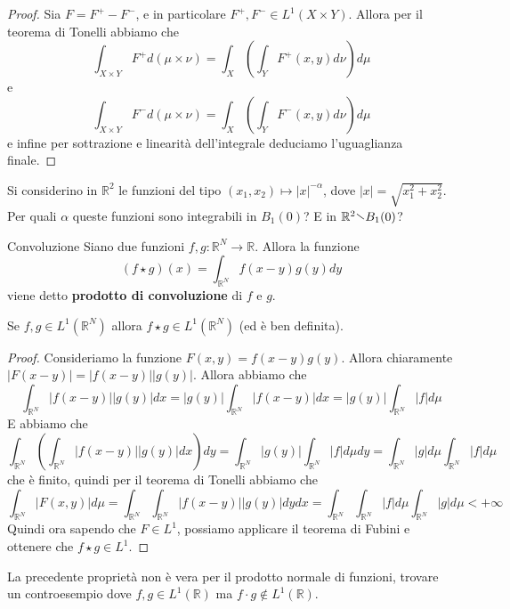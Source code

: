 \begin{proof}
    Sia \(F = F^{+} - F^{-}\), e in particolare \(F^{+}, F^{-} \in L^{1}(X
    \times Y)\). Allora per il teorema di Tonelli abbiamo che
    \[
        \int_{X \times Y} F^{+} d(\mu \times \nu) = \int_X \left( \int_Y F^{+}(x,y)
        d\nu \right) d\mu
    \]
    e
    \[
        \int_{X \times Y} F^{-} d(\mu \times \nu) = \int_X \left( \int_Y F^{-}(x,y)
        d\nu \right) d\mu
    \]
    e infine per sottrazione e linearità dell'integrale deduciamo l'uguaglianza
    finale.
\end{proof}
\begin{eser}
    Si considerino in \(\mathbb{R}^2\) le funzioni del tipo \((x_{1}, x_{2})
    \mapsto |x|^{-\alpha}\), dove \(|x| = \sqrt{x_{1}^2 + x_{2}^2}\). Per quali
    \(\alpha\) queste funzioni sono integrabili in \(B_{1}(0)\)? E in
    \(\mathbb{R}^2 \sminus B_{1}(0)\)?
\end{eser}
\begin{definition}{Convoluzione}
    Siano due funzioni \(f, g : \mathbb{R}^{N} \to \mathbb{R}\). Allora la
    funzione
    \[
        (f \star g)(x) = \int_{\mathbb{R}^{N}} f(x-y) g(y) dy
    \]
    viene detto \textbf{prodotto di convoluzione} di \(f\) e \(g\).
\end{definition}
\begin{proposition}\label{prp:convoluzione_l1}
    Se \(f, g \in L^{1}(\mathbb{R}^{N})\) allora \(f \star g \in
    L^{1}(\mathbb{R}^{N})\) (ed è ben definita).
\end{proposition}
\begin{proof}
    Consideriamo la funzione \(F(x, y) = f(x-y) g(y)\). Allora chiaramente
    \(|F(x-y)| = |f(x-y)||g(y)|\). Allora abbiamo che
    \[
\int_{\mathbb{R}^{N}}
        |f(x-y)||g(y)| dx = |g(y)| \int_{\mathbb{R}^{N}} |f(x-y)| dx = |g(y)|
        \int_{\mathbb{R}^{N}} |f| d\mu
    \]
    E abbiamo che
    \[
        \int_{\mathbb{R}^{N}} {\left( \int_{\mathbb{R}^{N}} |f(x-y)| |g(y)| dx
        \right)} dy = \int_{\mathbb{R}^{N}} |g(y)| \int_{\mathbb{R}^{N}} |f|
        d\mu dy = \int_{\mathbb{R}^{N}} |g| d\mu \int_{\mathbb{R}^{N}} |f| d\mu
    \]
    che è finito, quindi per il teorema di Tonelli abbiamo che
    \[
        \int_{\mathbb{R}^{N}} |F(x, y)| d\mu =
         \int_{\mathbb{R}^{N}}
        \int_{\mathbb{R}^{N}} |f(x-y)||g(y)| dy dx = \int_{\mathbb{R}^{N}}
        \int_{\mathbb{R}^{N}}|f|d\mu \int_{\mathbb{R}^{N}} |g|d\mu < +\infty    
    \]
    Quindi ora sapendo che \(F \in L^{1}\), possiamo applicare il teorema di
    Fubini e ottenere che \(f \star g \in L^{1}\).
\end{proof}
\begin{eser}
    La precedente proprietà non è vera per il prodotto normale di funzioni,
    trovare un controesempio dove \(f, g \in L^{1}(\mathbb{R})\) ma \(f \cdot g
    \not\in L^{1}(\mathbb{R})\).
\end{eser}

